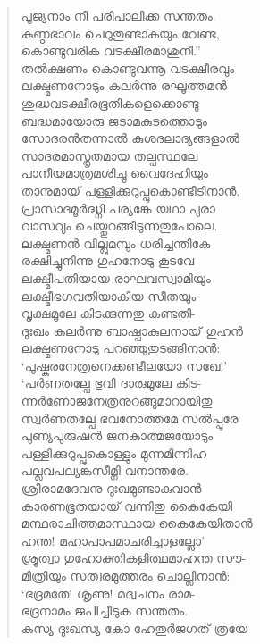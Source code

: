 \begin{verse}
പൂജ്യനാം നീ പരിപാലിക്ക സന്തതം.\\
കുണ്ഠഭാവം ചെറുതുണ്ടാകയും വേണ്ട,\\
കൊണ്ടുവരിക വടക്ഷീരമാശുനീ.”\\
തല്‍ക്ഷണം കൊണ്ടുവന്നൂ വടക്ഷീരവും\\
ലക്ഷ്മണനോടും കലര്‍ന്നു രഘൂത്തമന്‍\\
ശുദ്ധവടക്ഷീരഭൂതികളെക്കൊണ്ടു\\
ബദ്ധമായോരു ജടാമകുടത്തൊടും\\
സോദരന്‍തന്നാല്‍ കുശദലാദ്യങ്ങളാല്‍\\
സാദരമാസ്തൃതമായ തല്പസ്ഥലേ\\
പാനീയമാത്രമശിച്ചു വൈദേഹിയും\\
താനുമായ് പള്ളിക്കുറുപ്പുകൊണ്ടീടിനാന്‍.\\
പ്രാസാദമൂര്‍ദ്ധ്നി പര്യങ്കേ യഥാ പുരാ\\
വാസവും ചെയ്തുറങ്ങീടുന്നതുപോലെ.\\
ലക്ഷ്മണന്‍ വില്ലുമമ്പും ധരിച്ചന്തികേ\\
രക്ഷിച്ചുനിന്നു ഗുഹനോടു കൂടവേ\\
ലക്ഷ്മീപതിയായ രാഘവസ്വാമിയും\\
ലക്ഷ്മീഭഗവതിയാകിയ സീതയും\\
വൃക്ഷമൂലേ കിടക്കുന്നതു കണ്ടതി-\\
ദുഃഖം കലര്‍ന്നു ബാഷ്പാകുലനായ് ഗുഹന്‍\\
ലക്ഷ്മണനോടു പറഞ്ഞുതുടങ്ങിനാന്‍:\\
‘പുഷ്കരനേത്രനെക്കണ്ടീലയോ സഖേ!’\\
‘പര്‍ണതല്പേ ഭുവി ദാരുമൂലേ കിട-\\
ന്നര്‍ണോജനേത്രനുറങ്ങുമാറായിതു\\
സ്വര്‍ണതല്പേ ഭവനോത്തമേ സല്‍പ്പുരേ\\
പുണ്യപുരുഷന്‍ ജനകാത്മജയോടും\\
പള്ളിക്കുറുപ്പുകൊള്ളും മുന്നമിന്നിഹ\\
പല്ലവപല്യങ്കസീമ്നി വനാന്തരേ.\\
ശ്രീരാമദേവനു ദുഃഖമുണ്ടാകുവാന്‍\\
കാരണഭൂതയായ് വന്നിതു കൈകേയി\\
മന്ഥരാചിത്തമാസ്ഥായ കൈകേയിതാന്‍\\
ഹന്ത! മഹാപാപമാചരിച്ചാളല്ലോ’\\
ശ്രുത്വാ ഗുഹോക്തികളിത്ഥമാഹന്ത സൗ-\\
മിത്രിയും സത്വരമുത്തരം ചൊല്ലിനാന്‍:\\
‘ഭദ്രമതേ! ശൃണു! മദ്വചനം രാമ-\\
ഭദ്രനാമം ജപിച്ചീടുക സന്തതം.\\
കസ്യ ദുഃഖസ്യ കോ ഹേതുര്‍ജഗത് ത്രയേ\\

\end{verse}
